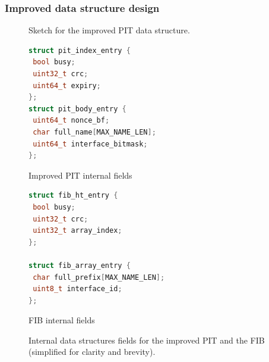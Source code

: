 \documentclass[11pt,a4paper,twoside,titlepage,openany]{book}
\begin{document}
\subsubsection{Improved data structure design}\label{sec:augustus.pit.new}

\begin{figure}[htb]
  \begin{center}
    \caption[Sketch for the improved PIT data structure]{Sketch for the improved PIT data structure.}
    \label{fig:augustus.newpit}
  \end{center}
\end{figure}

\begin{figure}[htb]
  \captionsetup{type=lstlisting}
  \begin{sublstlisting}[t]{.5\linewidth}
  \begin{lstlisting}[language=c]
struct pit_index_entry {
 bool busy;
 uint32_t crc;
 uint64_t expiry;
};
struct pit_body_entry {
 uint64_t nonce_bf;
 char full_name[MAX_NAME_LEN];
 uint64_t interface_bitmask;
};
    \end{lstlisting}
    \caption{Improved PIT internal fields}\label{lst:augustus.newpit}
  \end{sublstlisting}%
  \begin{sublstlisting}[t]{.5\linewidth}
  \begin{lstlisting}[language=c]
struct fib_ht_entry {
 bool busy;
 uint32_t crc;
 uint32_t array_index;
};

struct fib_array_entry {
 char full_prefix[MAX_NAME_LEN];
 uint8_t interface_id;
};
    \end{lstlisting}
    \caption{FIB internal fields}\label{lst:augustus.fib}
  \end{sublstlisting}
  \caption[Internal data structures fields for the improved PIT and the FIB]{Internal data structures fields for the improved PIT and the FIB (simplified for clarity and brevity).}\label{lst:augustus.newpit_fib}
\end{figure}
\end{document}
